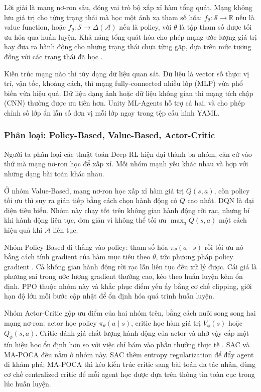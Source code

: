 \indent Lời giải là mạng nơ-ron sâu, đóng vai trò bộ xấp xỉ hàm tổng quát. Mạng không lưu giá trị cho từng trạng thái mà học một ánh xạ tham
số hóa: $f_\theta: \mathcal{S} \rightarrow \mathbb{R}$ nếu là value function, hoặc
$f_\theta: \mathcal{S} \rightarrow \Delta(\mathcal{A})$ nếu là policy, với $\theta$ là tập
tham số được tối ưu hóa qua huấn luyện. Khả năng tổng quát hóa cho phép mạng ước lượng giá
trị hay đưa ra hành động cho những trạng thái chưa từng gặp, dựa trên mức tương đồng với
các trạng thái đã học \cite{sutton2018reinforcement}.

\indent Kiến trúc mạng nào thì tùy dạng dữ liệu quan sát. Dữ liệu là vector số thực: vị
trí, vận tốc, khoảng cách, thì mạng fully-connected nhiều lớp (MLP) vừa phổ biến vừa
hiệu quả. Dữ liệu dạng ảnh hoặc dữ liệu không gian thì mạng tích chập (CNN) thường được ưu
tiên hơn. Unity ML-Agents hỗ trợ cả hai, và cho phép chỉnh số lớp ẩn lẫn số đơn vị mỗi lớp
ngay trong tệp cấu hình YAML.

\subsubsection{Phân loại: Policy-Based, Value-Based, Actor-Critic}
\indent Người ta phân loại các thuật toán Deep RL hiện đại thành ba nhóm, căn cứ vào thứ
mà mạng nơ-ron học để xấp xỉ. Mỗi nhóm mạnh yếu khác nhau và hợp với những dạng bài toán
khác nhau.

\indent Ở nhóm Value-Based, mạng nơ-ron học xấp xỉ hàm giá trị $Q(s, a)$, còn policy tối
ưu thì suy ra gián tiếp bằng cách chọn hành động có $Q$ cao nhất. DQN
\cite{mnih2015humanlevel} là đại diện tiêu biểu. Nhóm này chạy tốt trên không gian hành
động rời rạc, nhưng bí khi hành động liên tục, đơn giản vì không thể tối ưu $\max_a
Q(s,a)$ một cách hiệu quả khi $\mathcal{A}$ liên tục.

\indent Nhóm Policy-Based đi thẳng vào policy: tham số hóa $\pi_\theta(a \mid s)$ rồi tối
ưu nó bằng cách tính gradient của hàm mục tiêu theo $\theta$, tức phương pháp policy
gradient \cite{williams1992simple}. Cả không gian hành động rời rạc lẫn liên tục đều xử
lý được. Cái giá là phương sai trong ước lượng gradient thường cao, kéo theo huấn luyện
kém ổn định. PPO \cite{schulman2017proximal} thuộc nhóm này và khắc phục điểm yếu ấy bằng
cơ chế clipping, giới hạn độ lớn mỗi bước cập nhật để ổn định hóa quá trình huấn luyện.

\indent Nhóm Actor-Critic gộp ưu điểm của hai nhóm trên, bằng cách nuôi song song hai
mạng nơ-ron: actor học policy $\pi_\theta(a \mid s)$, critic học hàm giá trị $V_\phi(s)$
hoặc $Q_\phi(s,a)$. Critic đánh giá chất lượng hành động của actor và nhờ vậy cấp một tín
hiệu học ổn định hơn so với việc chỉ bám vào phần thưởng thực tế
\cite{mnih2016asynchronous}. SAC \cite{haarnoja2018soft} và MA-POCA \cite{cohen2022mapoca}
đều nằm ở nhóm này. SAC thêm entropy regularization để đẩy agent đi khám phá; MA-POCA thì
kéo kiến trúc critic sang bài toán đa tác nhân, dùng cơ chế centralized critic để mỗi agent
học được dựa trên thông tin toàn cục trong lúc huấn luyện.

